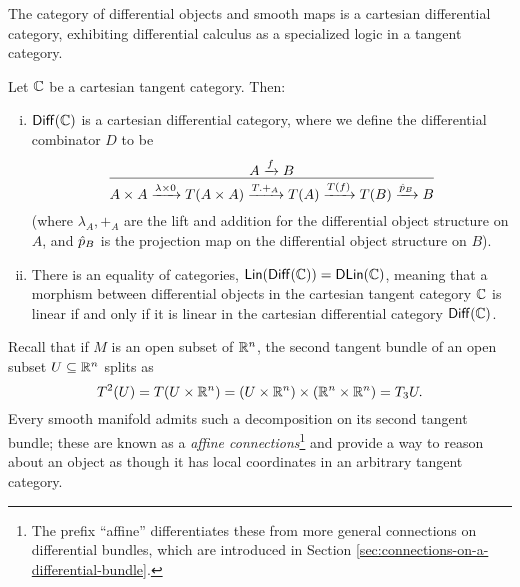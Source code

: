 The category of differential objects and smooth maps is a cartesian differential category, exhibiting differential calculus as a specialized logic in a tangent category. 
\begin{proposition}\label{prop:diff-obs-cdc}
    Let $\mathbb{C}$ be a cartesian tangent category.
    Then:
    \begin{enumerate}[(i)]
        \item $\mathsf{Diff}(\mathbb{C})$ is a cartesian differential category, where we define the differential combinator $D$ to be
        \[
            \infer{A \x A \xrightarrow{\lambda \x 0} T(A \x A) \xrightarrow[]{T.+_A} T(A) \xrightarrow{T(f)} T(B) \xrightarrow{\phat_B} B}{A \xrightarrow{f} B}
        \]
        (where $\lambda_A, +_A$ are the lift and addition for the differential object structure on $A$, and $\hat{p}_B$ is the projection map on the differential object structure on $B$).
        \item There is an equality of categories, $\mathsf{Lin}(\mathsf{Diff}(\mathbb{C})) = \mathsf{DLin}(\mathbb{C})$, meaning that a morphism between differential objects in the cartesian tangent category $\mathbb{C}$ is linear if and only if it is linear in the cartesian differential category $\mathsf{Diff}(\mathbb{C})$.
    \end{enumerate}
\end{proposition}
Recall that if $M$ is an open subset of $\mathbb{R}^n$, the second tangent bundle of an open subset $U \subseteq \mathbb{R}^n$ splits as
\[
    T^2(U) = T(U \times \mathbb{R}^n) = (U \times \mathbb{R}^n) \times (\mathbb{R}^n \times \mathbb{R}^n) = T_3U.
\]
Every smooth manifold admits such a decomposition on its second tangent bundle; these are known as a \emph{affine connections}\footnote{The prefix ``affine'' differentiates these from more general connections on differential bundles, which are introduced in Section \ref{sec:connections-on-a-differential-bundle}.} and provide a way to reason about an object as though it has local coordinates in an arbitrary tangent category.

